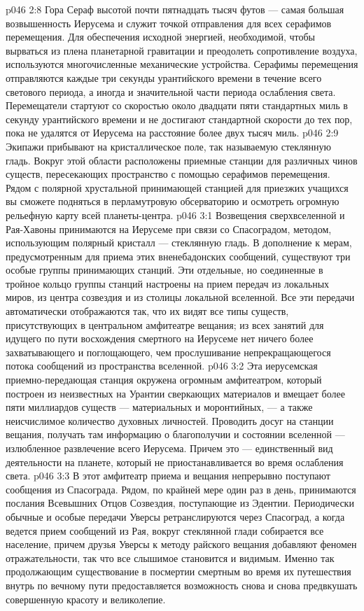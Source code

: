 \vs p046 2:8 \pc Гора Сераф высотой почти пятнадцать тысяч футов --- самая большая возвышенность Иерусема и служит точкой отправления для всех серафимов перемещения. Для обеспечения исходной энергией, необходимой, чтобы вырваться из плена планетарной гравитации и преодолеть сопротивление воздуха, используются многочисленные механические устройства. Серафимы перемещения отправляются каждые три секунды урантийского времени в течение всего светового периода, а иногда и значительной части периода ослабления света. Перемещатели стартуют со скоростью около двадцати пяти стандартных миль в секунду урантийского времени и не достигают стандартной скорости до тех пор, пока не удалятся от Иерусема на расстояние более двух тысяч миль.
\vs p046 2:9 Экипажи прибывают на кристаллическое поле, так называемую стеклянную гладь. Вокруг этой области расположены приемные станции для различных чинов существ, пересекающих пространство с помощью серафимов перемещения. Рядом с полярной хрустальной принимающей станцией для приезжих учащихся вы сможете подняться в перламутровую обсерваторию и осмотреть огромную рельефную карту всей планеты\hyp{}центра.
\vs p046 3:1 Возвещения сверхвселенной и Рая\hyp{}Хавоны принимаются на Иерусеме при связи со Спасоградом, методом, использующим полярный кристалл --- стеклянную гладь. В дополнение к мерам, предусмотренным для приема этих вненебадонских сообщений, существуют три особые группы принимающих станций. Эти отдельные, но соединенные в тройное кольцо группы станций настроены на прием передач из локальных миров, из центра созвездия и из столицы локальной вселенной. Все эти передачи автоматически отображаются так, что их видят все типы существ, присутствующих в центральном амфитеатре вещания; из всех занятий для идущего по пути восхождения смертного на Иерусеме нет ничего более захватывающего и поглощающего, чем прослушивание непрекращающегося потока сообщений из пространства вселенной.
\vs p046 3:2 Эта иерусемская приемно\hyp{}передающая станция окружена огромным амфитеатром, который построен из неизвестных на Урантии сверкающих материалов и вмещает более пяти миллиардов существ --- материальных и моронтийных, --- а также неисчислимое количество духовных личностей. Проводить досуг на станции вещания, получать там информацию о благополучии и состоянии вселенной --- излюбленное развлечение всего Иерусема. Причем это --- единственный вид деятельности на планете, который не приостанавливается во время ослабления света.
\vs p046 3:3 В этот амфитеатр приема и вещания непрерывно поступают сообщения из Спасограда. Рядом, по крайней мере один раз в день, принимаются послания Всевышних Отцов Созвездия, поступающие из Эдентии. Периодически обычные и особые передачи Уверсы ретранслируются через Спасоград, а когда ведется прием сообщений из Рая, вокруг стеклянной глади собирается все население, причем друзья Уверсы к методу райского вещания добавляют феномен отражательности, так что все слышимое становится и видимым. Именно так продолжающим существование в посмертии смертным во время их путешествия внутрь по вечному пути предоставляется возможность снова и снова предвкушать совершенную красоту и великолепие.
